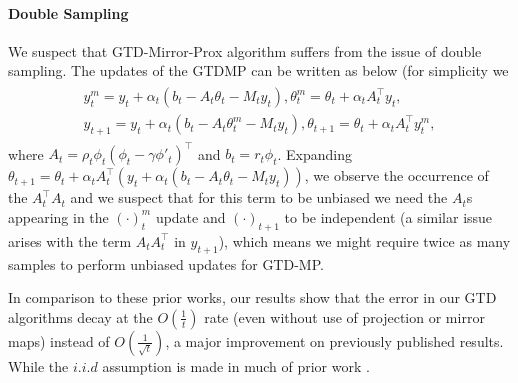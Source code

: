 \paragraph{Double Sampling} We suspect that GTD-Mirror-Prox algorithm suffers from the issue of double sampling. The updates of the GTDMP can be written as below (for simplicity we 
\begin{align}\label{eq:gtdmp}
\begin{split}
y_t^m=y_t+\alpha_t(b_t-A_t\theta_t- M_t y_t), \theta_t^m=\theta_t+\alpha_t A_t^\top y_t,\\
y_{t+1}=y_t+\alpha_t(b_t-A_t\theta_t^m- M_t y_t), \theta_{t+1}=\theta_t+\alpha_t A_t^\top y_t^m,\end{split}
\end{align}
where $A_t=\rho_t\phi_t(\phi_t-\gamma\phi'_t)^\top$ and $b_t=r_t\phi_t$. Expanding $\theta_{t+1}=\theta_t+\alpha_tA_t^\top\left(y_t+ \alpha_t (b_t-A_t\theta_t- M_t y_t) \right)$, we observe the occurrence of the $A^\top_tA_t$ and we suspect that for this term to be unbiased we need the $A_t$s appearing in the $(\cdot)^m_t$ update and $(\cdot)_{t+1}$ to be independent (a similar issue arises with the term $A_tA^\top_t$ in $y_{t+1}$), which means we might require twice as many samples to perform unbiased updates for GTD-MP.
\begin{comment}
 Letting $x_t=(y_t,\theta_t)$, $H_t=\begin{matrix}M_t &A_t\\ -A_t^\top &\mathbf{0}_{\dcd}\end{matrix}$, and $g_t=\begin{matrix}b_t\\ 0\end{matrix}$ we re-write \eqref{eq:gtdmp} as
\begin{align}\label{eq:gtdmpshort}
x_t^m&=x_t+\alpha_t( g_t-H_t x_t), \\
x_{t+1}&=x_t+\alpha_t( g_t-H_t x_t^m),
&=x_t+\alpha_t\left( (g_t-\alpha_t H_t  g_t) -(H_t -\alpha_t H_t^2 ) x_t\right),
\end{align}
The stationary linear system corresponding to \eqref{eq:gtdmpshort} is $\E[H_t] x=\E[g_t]-\E[H_t g_t]$
\end{comment}
In comparison to these prior works, our results show that the error in our GTD  algorithms decay at the $O(\frac{1}{t})$ rate (even without use of projection or mirror maps) instead of $O(\frac{1}{\sqrt{t}})$, a major improvement on previously published results. While the $i.i.d$ assumption is made in much of prior work \cite{gtd2,gtdmp}.
